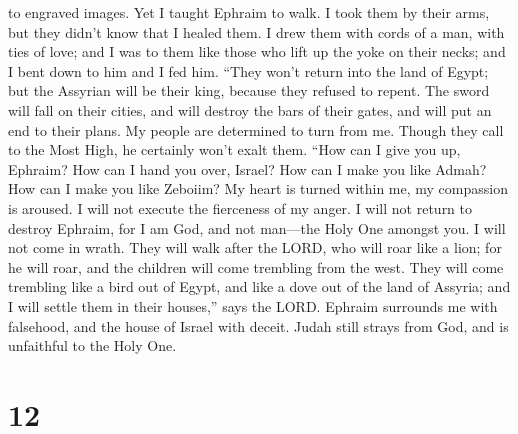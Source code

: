 to engraved images.  Yet I taught Ephraim to walk. I took
them by their arms, but they didn't know that I healed them.
 I drew them with cords of a man, with ties of love; and I
was to them like those who lift up the yoke on their necks; and I bent
down to him and I fed him.  ``They won't return into the
land of Egypt; but the Assyrian will be their king, because they refused
to repent.  The sword will fall on their cities, and will
destroy the bars of their gates, and will put an end to their plans.
 My people are determined to turn from me. Though they call
to the Most High, he certainly won't exalt them.  ``How can
I give you up, Ephraim? How can I hand you over, Israel? How can I make
you like Admah? How can I make you like Zeboiim? My heart is turned
within me, my compassion is aroused.  I will not execute the
fierceness of my anger. I will not return to destroy Ephraim, for I am
God, and not man---the Holy One amongst you. I will not come in wrath.
 They will walk after the LORD, who will roar like a lion;
for he will roar, and the children will come trembling from the west.
 They will come trembling like a bird out of Egypt, and
like a dove out of the land of Assyria; and I will settle them in their
houses,'' says the LORD.  Ephraim surrounds me with
falsehood, and the house of Israel with deceit. Judah still strays from
God, and is unfaithful to the Holy One.

\hypertarget{section-6}{%
\section{12}\label{section-6}}

